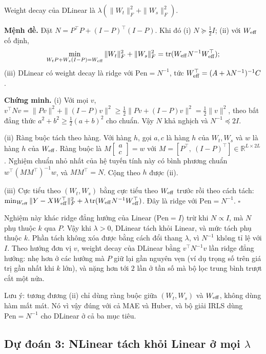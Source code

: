 Weight decay của DLinear là $\lambda(\|W_t\|_F^2 + \|W_s\|_F^2)$.

\textbf{Mệnh đề.} Đặt $N = P^\top P + (I - P)^\top (I - P)$. Khi đó (i) $N \succeq \tfrac12 I$; (ii) với $W_{\mathrm{eff}}$ cố định,
\begin{equation}
    \min_{W_t P + W_s (I-P) = W_{\mathrm{eff}}} \|W_t\|_F^2 + \|W_s\|_F^2 = \operatorname{tr}(W_{\mathrm{eff}} N^{-1} W_{\mathrm{eff}}^\top);
\end{equation}
(iii) DLinear có weight decay là ridge với $\mathrm{Pen} = N^{-1}$, tức $W_{\mathrm{eff}}^\top = (A + \lambda N^{-1})^{-1} C$.

\textbf{Chứng minh.} (i) Với mọi $v$, $v^\top N v = \|Pv\|^2 + \|(I-P)v\|^2 \ge \tfrac12 \|Pv + (I-P)v\|^2 = \tfrac12\|v\|^2$, theo bất đẳng thức $a^2 + b^2 \ge \tfrac12 (a+b)^2$ cho chuẩn. Vậy $N$ khả nghịch và $N^{-1} \preceq 2I$.

(ii) Ràng buộc tách theo hàng. Với hàng $h$, gọi $a, c$ là hàng $h$ của $W_t, W_s$ và $w$ là hàng $h$ của $W_{\mathrm{eff}}$. Ràng buộc là $M \begin{bmatrix} a \\ c \end{bmatrix} = w$ với $M = [P^\top,\ (I-P)^\top] \in \mathbb{R}^{L \times 2L}$. Nghiệm chuẩn nhỏ nhất của hệ tuyến tính này có bình phương chuẩn $w^\top (M M^\top)^{-1} w$, và $M M^\top = N$. Cộng theo $h$ được (ii).

(iii) Cực tiểu theo $(W_t, W_s)$ bằng cực tiểu theo $W_{\mathrm{eff}}$ trước rồi theo cách tách: $\min_{W_{\mathrm{eff}}} \|Y - XW_{\mathrm{eff}}^\top\|_F^2 + \lambda \operatorname{tr}(W_{\mathrm{eff}} N^{-1} W_{\mathrm{eff}}^\top)$. Đây là ridge với $\mathrm{Pen} = N^{-1}$. \hfill$\square$

Nghiệm này khác ridge đẳng hướng của Linear ($\mathrm{Pen} = I$) trừ khi $N \propto I$, mà $N$ phụ thuộc $k$ qua $P$. Vậy khi $\lambda > 0$, DLinear tách khỏi Linear, và mức tách phụ thuộc $k$. Phần tách không xóa được bằng cách đổi thang $\lambda$, vì $N^{-1}$ không tỉ lệ với $I$. Theo hướng đơn vị $v$, weight decay của DLinear bằng $v^\top N^{-1} v$ lần ridge đẳng hướng: nhẹ hơn ở các hướng mà $P$ giữ lại gần nguyên vẹn (ví dụ trọng số trên giá trị gần nhất khi $k$ lớn), và nặng hơn tới $2$ lần ở tần số mà bộ lọc trung bình trượt cắt một nửa.

Lưu ý: tương đương (ii) chỉ dùng ràng buộc giữa $(W_t, W_s)$ và $W_{\mathrm{eff}}$, không dùng hàm mất mát. Nó vì vậy đúng với cả MAE và Huber, và bộ giải IRLS dùng $\mathrm{Pen} = N^{-1}$ cho DLinear ở cả ba mục tiêu.

\subsection{Dự đoán 3: NLinear tách khỏi Linear ở mọi \texorpdfstring{$\lambda$}{lambda}}

